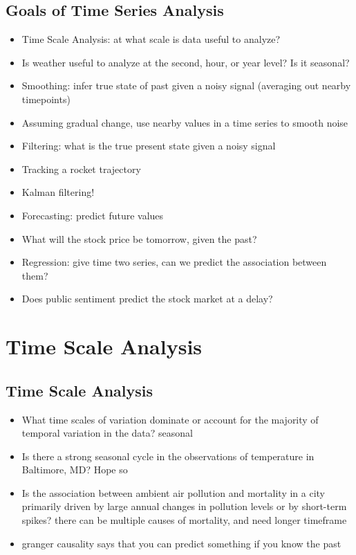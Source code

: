 \documentclass[11pt]{article}
\theoremstyle{definition}
\begin{document}
\subsection{Goals of Time Series Analysis}
\begin{itemize}
  \item Time Scale Analysis: at what scale is data useful to analyze?
  \item Is weather useful to analyze at the second, hour, or year level? Is it seasonal?
  \item Smoothing: infer true state of past given a noisy signal (averaging out nearby timepoints)
  \item Assuming gradual change, use nearby values in a time series to smooth noise
  \item Filtering: what is the true present state given a noisy signal
  \item Tracking a rocket trajectory
  \item Kalman filtering!
  \item Forecasting: predict future values
  \item What will the stock price be tomorrow, given the past?
  \item Regression: give time two series, can we predict the association between them?
  \item Does public sentiment predict the stock market at a delay?
\end{itemize}

\section{Time Scale Analysis}
\subsection{Time Scale Analysis}
\begin{itemize}
  \item What time scales of variation dominate or account for the
  majority of temporal variation in the data? seasonal
  \item Is there a strong seasonal cycle in the observations of
  temperature in Baltimore, MD? Hope so
  \item Is the association between ambient air pollution and mortality in
  a city primarily driven by large annual changes in pollution
  levels or by short-term spikes? there can be multiple causes of mortality, and need longer timeframe
  \item granger causality says that you can predict something if you know the past
\end{itemize}
\end{document}
